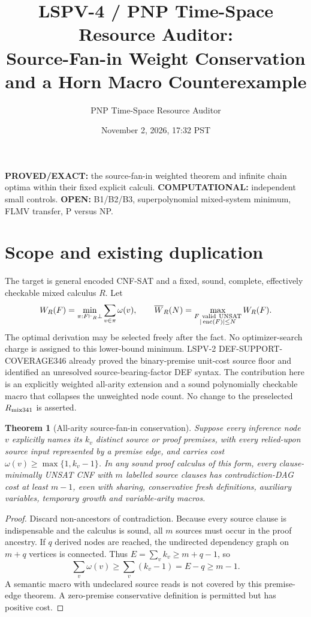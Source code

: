 \documentclass[11pt]{article}
\title{LSPV-4 / PNP Time-Space Resource Auditor: \\ Source-Fan-in Weight Conservation and a Horn Macro Counterexample}
\author{PNP Time-Space Resource Auditor}
\date{November 2, 2026, 17:32 PST}
\newtheorem{theorem}{Theorem}
\begin{document}
\maketitle
\noindent \textbf{PROVED/EXACT:} the source-fan-in weighted theorem and infinite chain optima within their fixed explicit calculi. \textbf{COMPUTATIONAL:} independent small controls. \textbf{OPEN:} B1/B2/B3, superpolynomial mixed-system minimum, FLMV transfer, P versus NP.

\section*{Scope and existing duplication}
The target is general encoded CNF-SAT and a fixed, sound, complete, effectively checkable mixed calculus $R$. Let
\[
W_R(F)=\min_{\pi:F\vdash_R\bot}\sum_{v\in\pi}\omega(v),\qquad
\overline W_R(N)=\max_{\substack{F\ {\rm valid\ UNSAT}\\|\operatorname{enc}(F)|\le N}}W_R(F).
\]
The optimal derivation may be selected freely after the fact. No optimizer-search charge is assigned to this lower-bound minimum. LSPV-2 DEF-SUPPORT-COVERAGE346 already proved the binary-premise unit-cost source floor and identified an unresolved source-bearing-factor DEF syntax. The contribution here is an explicitly weighted all-arity extension and a sound polynomially checkable macro that collapses the unweighted node count. No change to the preselected $R_{\rm mix341}$ is asserted.

\begin{theorem}[All-arity source-fan-in conservation]
Suppose every inference node $v$ explicitly names its $k_v$ distinct source or proof premises, with every relied-upon source input represented by a premise edge, and carries cost $\omega(v)\ge\max\{1,k_v-1\}$. In any sound proof calculus of this form, every clause-minimally UNSAT CNF with $m$ labelled source clauses has contradiction-DAG cost at least $m-1$, even with sharing, conservative fresh definitions, auxiliary variables, temporary growth and variable-arity macros.
\end{theorem}
\begin{proof}
Discard non-ancestors of contradiction. Because every source clause is indispensable and the calculus is sound, all $m$ sources must occur in the proof ancestry. If $q$ derived nodes are reached, the undirected dependency graph on $m+q$ vertices is connected. Thus $E=\sum_v k_v\ge m+q-1$, so
\[
\sum_v\omega(v)\ge \sum_v(k_v-1)=E-q\ge m-1.
\]
A semantic macro with undeclared source reads is not covered by this premise-edge theorem. A zero-premise conservative definition is permitted but has positive cost.
\end{proof}
\end{document}
